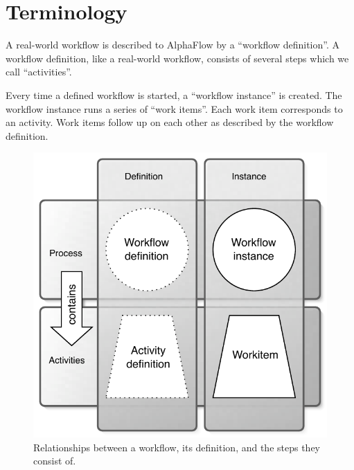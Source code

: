 \section{Terminology}

A real-world workflow is described to AlphaFlow by a ``workflow definition''.
A workflow definition, like a real-world workflow, consists of several steps
which we call ``activities''.

Every time a defined workflow is started, a ``workflow instance'' is created.
The workflow instance runs a series of ``work items''. Each work item
corresponds to an activity. Work items follow up on each other as described by
the workflow definition.

\begin{figure}
  \centering
  \includegraphics{terminology}
  \caption{\label{fig:terminology}%
    Relationships between a workflow, its definition, and the steps they
    consist of.}
\end{figure}
